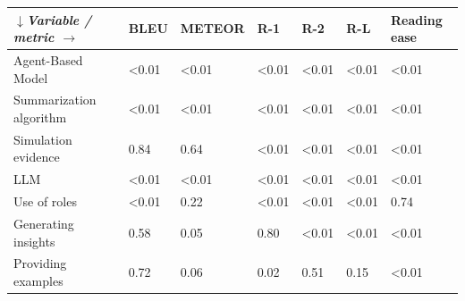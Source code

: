 \begin{tabular}{|l|l|l|l|l|l|l|}
\hline
\textit{$\downarrow$Variable / metric $\rightarrow$} & BLEU & METEOR & R-1 & R-2 & R-L & Reading ease \\
 \hline
 Agent-Based Model & \textless{}0.01 & \textless{}0.01 & \textless{}0.01 & \textless{}0.01 & \textless{}0.01 & \textless{}0.01 \\
 \hline
 Summarization algorithm & \textless{}0.01 & \textless{}0.01 & \textless{}0.01 & \textless{}0.01 & \textless{}0.01 & \textless{}0.01 \\
 \hline
 Simulation evidence & 0.84 & 0.64 & \textless{}0.01 & \textless{}0.01 & \textless{}0.01 & \textless{}0.01 \\
 \hline
 LLM & \textless{}0.01 & \textless{}0.01 & \textless{}0.01 & \textless{}0.01 & \textless{}0.01 & \textless{}0.01 \\
 \hline
 Use of roles & \textless{}0.01 & 0.22 & \textless{}0.01 & \textless{}0.01 & \textless{}0.01 & 0.74 \\
 \hline
 Generating insights & 0.58 & 0.05 & 0.80 & \textless{}0.01 & \textless{}0.01 & \textless{}0.01 \\
 \hline
 Providing examples & 0.72 & 0.06 & 0.02 & 0.51 & 0.15 & \textless{}0.01 \\
\hline
\end{tabular}
